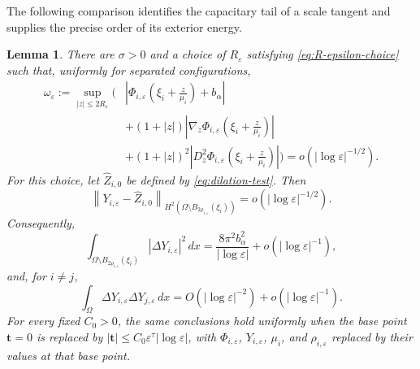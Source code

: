 \documentclass[11pt]{article}
\newtheorem{lemma}[theorem]{Lemma}
\numberwithin{equation}{section}
\begin{document}
The following comparison identifies the capacitary tail of a scale
tangent and supplies the precise order of its exterior energy.

\begin{lemma}\label{lem:scale-tangent-exterior}
There are $\sigma>0$ and a choice of $R_\varepsilon$ satisfying
\eqref{eq:R-epsilon-choice} such that, uniformly for separated
configurations,
\begin{equation}\label{eq:scale-tangent-growing-ball}
\begin{aligned}
\omega_\varepsilon:=\sup_{|z|\leq2R_\varepsilon}
\Bigg(&\left|\Phi_{i,\varepsilon}
\left(\xi_i+\frac z{\mu_i}\right)+b_\alpha\right|\\
&+(1+|z|)\left|\nabla_z\Phi_{i,\varepsilon}
\left(\xi_i+\frac z{\mu_i}\right)\right|\\
&+(1+|z|)^2\left|D_z^2\Phi_{i,\varepsilon}
\left(\xi_i+\frac z{\mu_i}\right)\right|\Bigg)
=o(|\log\varepsilon|^{-1/2}).
\end{aligned}
\end{equation}
For this choice, let $\widehat Z_{i,0}$ be defined by
\eqref{eq:dilation-test}. Then
\begin{equation}\label{eq:scale-tangent-exterior-comparison}
\left\|
Y_{i,\varepsilon}-\widehat Z_{i,0}
\right\|_{H^2(\Omega\setminus
B_{2\rho_{i,\varepsilon}}(\xi_i))}
=o(|\log\varepsilon|^{-1/2}).
\end{equation}
Consequently,
\begin{equation}\label{eq:scale-tangent-exterior-energy}
\int_{\Omega\setminus
B_{2\rho_{i,\varepsilon}}(\xi_i)}
|\Delta Y_{i,\varepsilon}|^2\,dx
=
\frac{8\pi^2b_\alpha^2}{|\log\varepsilon|}
+o(|\log\varepsilon|^{-1}),
\end{equation}
and, for $i\neq j$,
\begin{equation}\label{eq:scale-tangent-cross-energy}
\int_\Omega
\Delta Y_{i,\varepsilon}\Delta Y_{j,\varepsilon}\,dx
=O(|\log\varepsilon|^{-2})
+o(|\log\varepsilon|^{-1}).
\end{equation}
For every fixed $C_0>0$, the same conclusions hold uniformly when the
base point $\boldsymbol t=0$ is replaced by
$|\boldsymbol t|\leq C_0\varepsilon^\tau|\log\varepsilon|$, with
$\Phi_{i,\varepsilon}$, $Y_{i,\varepsilon}$, $\mu_i$, and
$\rho_{i,\varepsilon}$ replaced by their values at that base point.
\end{lemma}
\end{document}
